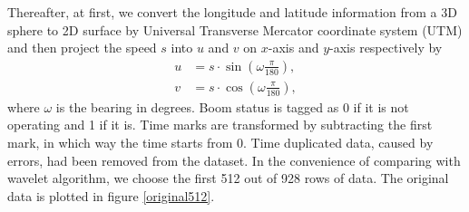 Thereafter, at first, we convert the longitude and latitude information from a 3D sphere to 2D surface by Universal Transverse Mercator coordinate system (UTM) and then project the speed $s$ into $u$ and $v$ on $x$-axis and $y$-axis respectively by 
\begin{align}
u &=s\cdot \sin \left(\omega\frac{\pi}{180}\right),\\
v &= s\cdot \cos \left(\omega\frac{\pi}{180}\right),
\end{align}
where $\omega$ is the bearing in degrees. Boom status is tagged as 0 if it is not operating and 1 if it is. Time marks are transformed by subtracting the first mark, in which way the time starts from 0. Time duplicated data, caused by errors, had been removed from the dataset. In the convenience of comparing with wavelet algorithm, we choose the first 512 out of 928 rows of data. The original data is plotted in figure \ref{original512}.


